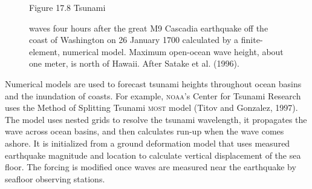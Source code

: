 \begin{figure}[t!]
\footnotesize
Figure 17.8 Tsunami \rule{0mm}{3ex}waves
four hours after the great M9 Cascadia earthquake off the coast of
Washington on 26 January 1700 calculated by a finite-element,
numerical model. Maximum open-ocean wave height, about one meter, is
north of Hawaii. After Satake et al. (1996).
\label{fig:tsunamiwave}

\vspace{-3ex}
\end{figure}

Numerical models are used to forecast tsunami heights throughout ocean
basins and the inundation of coasts. For example, \textsc{noaa}'s
Center for Tsunami Research uses the Method of Splitting Tsunami
\textsc{most} model (Titov and Gonzalez, 1997). The model uses nested
grids to resolve the tsunami wavelength, it propagates the wave across
ocean basins, and then calculates run-up when the wave comes
ashore. It is initialized from a ground deformation model that uses
measured earthquake magnitude and location to calculate vertical
displacement of the sea floor. The forcing is modified once waves are
measured near the earthquake by seafloor observing stations.

